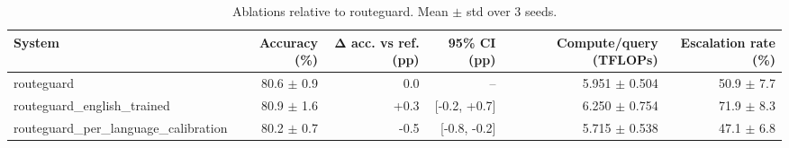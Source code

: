 \begin{table}[t]
\centering
\small
\caption{Ablations relative to routeguard. Mean $\pm$ std over 3 seeds.}
\label{tab:ablations}
\begin{tabular}{lrrrrr}
\toprule
System & Accuracy (\%) & Δ acc. vs ref. (pp) & 95\% CI (pp) & Compute/query (TFLOPs) & Escalation rate (\%) \\
\midrule
routeguard & 80.6 $\pm$ 0.9 & 0.0 & -- & 5.951 $\pm$ 0.504 & 50.9 $\pm$ 7.7 \\
routeguard\_english\_trained & 80.9 $\pm$ 1.6 & +0.3 & [-0.2, +0.7] & 6.250 $\pm$ 0.754 & 71.9 $\pm$ 8.3 \\
routeguard\_per\_language\_calibration & 80.2 $\pm$ 0.7 & -0.5 & [-0.8, -0.2] & 5.715 $\pm$ 0.538 & 47.1 $\pm$ 6.8 \\
\bottomrule
\end{tabular}
\end{table}
